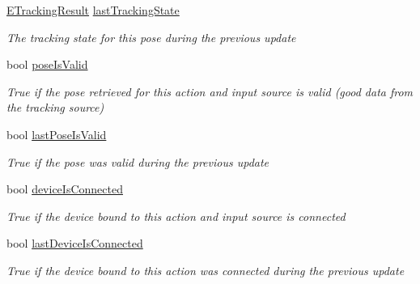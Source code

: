 \begin{DoxyCompactItemize}
\mbox{\hyperlink{namespace_valve_1_1_v_r_abe6feab98f33191b7c27b4292012e90a}{E\+Tracking\+Result}} \mbox{\hyperlink{class_valve_1_1_v_r_1_1_steam_v_r___action___pose___source_aaceb2ef18d1322c219d3d29c2a74300f}{last\+Tracking\+State}}
\begin{DoxyCompactList}\small\item\em The tracking state for this pose during the previous update \end{DoxyCompactList}\item 
bool \mbox{\hyperlink{class_valve_1_1_v_r_1_1_steam_v_r___action___pose___source_aba5be433facceba27f69a1833ab9b2c5}{pose\+Is\+Valid}}
\begin{DoxyCompactList}\small\item\em True if the pose retrieved for this action and input source is valid (good data from the tracking source) \end{DoxyCompactList}\item 
bool \mbox{\hyperlink{class_valve_1_1_v_r_1_1_steam_v_r___action___pose___source_a48916d9879663f513d2eaa4328aafc15}{last\+Pose\+Is\+Valid}}
\begin{DoxyCompactList}\small\item\em True if the pose was valid during the previous update \end{DoxyCompactList}\item 
bool \mbox{\hyperlink{class_valve_1_1_v_r_1_1_steam_v_r___action___pose___source_a09c882d2b6f8a42326f275afcaa2f763}{device\+Is\+Connected}}
\begin{DoxyCompactList}\small\item\em True if the device bound to this action and input source is connected \end{DoxyCompactList}\item 
bool \mbox{\hyperlink{class_valve_1_1_v_r_1_1_steam_v_r___action___pose___source_aeb0b6070720ed154363e6695c1f522e5}{last\+Device\+Is\+Connected}}
\begin{DoxyCompactList}\small\item\em True if the device bound to this action was connected during the previous update \end{DoxyCompactList}\item 

\end{DoxyCompactItemize}
